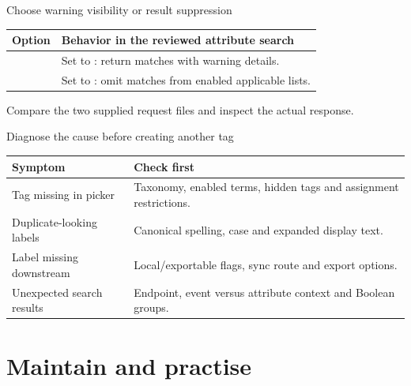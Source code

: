 \begin{frame}{Choose warning visibility or result suppression}
    \small
    \medskip
    \begin{tabular}{@{}P{4.8cm}P{5.4cm}@{}}
        \toprule
        Option & Behavior in the reviewed attribute search \\
        \midrule
         & Set to : return matches with warning details. \\
         & Set to : omit matches from enabled applicable lists. \\
        \bottomrule
    \end{tabular}
    \medskip
    Compare the two supplied request files and inspect the actual response.
\end{frame}

\begin{frame}{Diagnose the cause before creating another tag}
    \small
    \begin{tabular}{@{}P{3.3cm}P{6.9cm}@{}}
        \toprule
        Symptom & Check first \\
        \midrule
        Tag missing in picker & Taxonomy, enabled terms, hidden tags and assignment restrictions. \\
        Duplicate-looking labels & Canonical spelling, case and expanded display text. \\
        Label missing downstream & Local/exportable flags, sync route and export options. \\
        Unexpected search results & Endpoint, event versus attribute context and Boolean groups. \\
        \bottomrule
    \end{tabular}
\end{frame}

\section{Maintain and practise}

